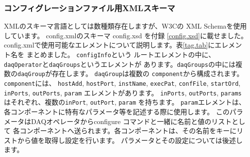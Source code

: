 \documentclass[a4j,10pt,dvips,onecolumn,oneside,final]{jarticle}%
\begin{document}
\subsubsection{コンフィグレーションファイル用XMLスキーマ}\label{config-schema}
XMLのスキーマ言語としては数種類存在しますが、W3Cの XML Schemaを使用しています。
config.xmlのスキーマ config.xsd を付録 \ref{config.xsd}に載せました。
config.xmlで使用可能なエレメントについて説明します。表\ref{tag.tab}にエレメント名を
まとめました。
\verb|configInfo|という
ルートエレメントの中に、\verb|daqOperator|と\verb|daqGroups|というエレメントが
あります。\verb|daqGroups|の中には複数の\verb|daqGroup|が存在します。
\verb|daqGroup|は複数の \verb|component|から構成されます。\verb|component|には、
\verb|hostAdd|, \verb|hostPort|, \verb|instName|, \verb|execPat|, \verb|confFile|,
\verb|startOrd|, \verb|inPorts|, \verb|outPorts|, \verb|param| エレメントがあります。
\verb|inPorts|, \verb|outPorts|, \verb|params| はそれぞれ、複数の\verb|inPort|,
\verb|outPort|, \verb|param| を持ちます。
\verb|param|エレメントは、各コンポーネントに特有なパラメータ等を記述する際に使用します。
このパラメータはDAQオペレータからconfigure コマンドと一緒に名前と値のリストとして
各コンポーネントへ送られます。各コンポーネントは、その名前をキーにリストから値を取得し設定を行います。
パラメータとその設定については後述します。
\end{document}
